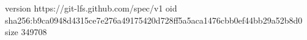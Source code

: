 version https://git-lfs.github.com/spec/v1
oid sha256:b9ca0948d4315ce7e276a49175420d728ff5a5aca1476cbb0ef44bb29a52b8d0
size 349708
